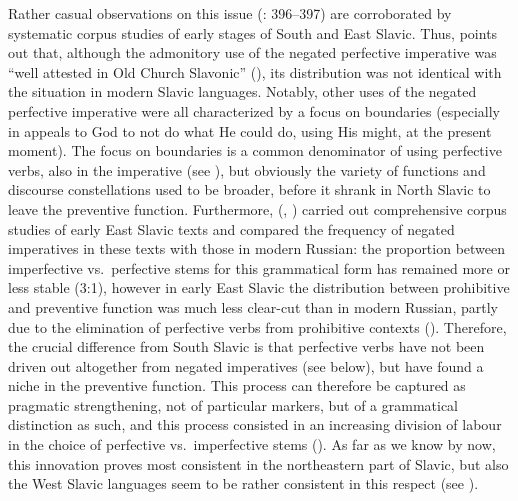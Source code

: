 \documentclass[output=paper,colorlinks,citecolor=brown]{langscibook}
\begin{document}
Rather casual observations on this issue (\citealt{Wiemer2008}: 396--397) are corroborated by systematic corpus studies of early stages of South and East Slavic. Thus, \citet{MacRobert2013} points out that, although the admonitory use of the negated perfective imperative was ``well attested in Old Church Slavonic'' (\citeyear[286]{MacRobert2013}), its distribution was not identical with the situation in modern Slavic languages. Notably, other uses of the negated perfective imperative were all characterized by a focus on boundaries (especially in appeals to God to not do what He could do, using His might, at the present moment). The focus on boundaries is a common denominator of using perfective verbs, also in the imperative (see ), but obviously the variety of functions and discourse constellations used to be broader, before it shrank in North Slavic to leave the preventive function. Furthermore, \citeauthor{Mišina2020a} (\citeyear{Mišina2020b}, \citeyear{Mišina2020a}) carried out comprehensive corpus studies of early East Slavic texts and compared the frequency of negated imperatives in these texts with those in modern Russian: the proportion between imperfective vs.\ perfective stems for this grammatical form has remained more or less stable (3:1), however in early East Slavic the distribution between prohibitive and preventive function was much less clear-cut than in modern Russian, partly due to the elimination of perfective verbs from prohibitive contexts (\citeyear [172--176]{Mišina2020b}). Therefore, the crucial difference from South Slavic is that perfective verbs have not been driven out altogether from negated imperatives (see below), but have found a niche in the preventive function. This process can therefore be captured as pragmatic strengthening, not of particular markers, but of a grammatical distinction as such, and this process consisted in an increasing division of labour in the choice of perfective vs.\ imperfective stems (). As far as we know by now, this innovation proves most consistent in the northeastern part of Slavic, but also the West Slavic languages seem to be rather consistent in this respect (see ).
\end{document}
